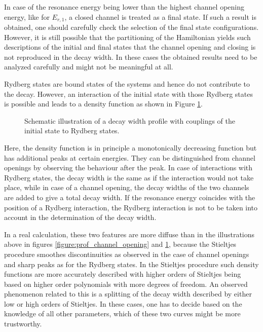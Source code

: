 In case of the resonance energy being lower than the highest channel
opening energy, like for $E_{r,1}$, a closed channel is treated as a final
state. If such a result is obtained, one should carefully check the selection
of the final state configurations. However, it is still possible that the
partitioning of the Hamiltonian yields such descriptions of the initial and
final states that the channel opening and closing is not reproduced in the
decay width. In these cases the obtained results need to be analyzed carefully
and might not be meaningful at all.

Rydberg states are bound states of the systems and hence do not contribute
to the decay. However, an interaction of the initial state with those
Rydberg states is possible and leads to a density function as shown in
Figure \ref{figure:prof_rydberg}.

\begin{figure}[h]
  \centering
  
  \caption{Schematic illustration of a decay width profile with couplings
           of the initial state to Rydberg states.}
  \label{figure:prof_rydberg}
\end{figure}
Here, the density function is in principle a monotonically decreasing function
but has additional peaks at certain energies. They can be distinguished from
channel openings by observing the behaviour after the peak. In case of
interactions with Rydberg states, the decay width is the same as if the interaction
would not take place, while in case of a channel opening, the decay widths
of the two channels are added to give a total decay width.
If the resonance energy coincides with the position of a Rydberg interaction,
the Rydberg interaction is not to be taken into account in the determination
of the decay width.

In a real calculation, these two features are more diffuse than in the
illustrations above in
figures \ref{figure:prof_channel_opening}
and \ref{figure:prof_rydberg}, because the Stieltjes procedure smoothes
discontinuities as observed in the case of channel openings and sharp peaks
as for the Rydberg states.
In the Stieltjes procedure such density functions are more accurately described
with higher orders of Stieltjes being based on higher order polynomials
with more degrees of freedom.
An observed phenomenon related to this is
a splitting of the decay width described by either low or high orders of Stieltjes.
In these cases, one has to decide based on the knowledge of all other
parameters, which of these two curves might be more trustworthy.

